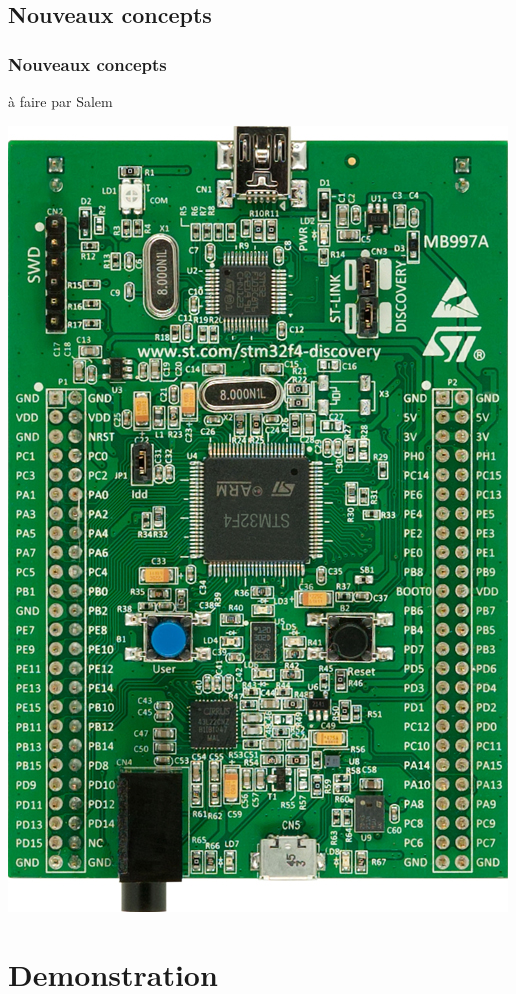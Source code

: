 \documentclass{beamer}
\begin{document}
\subsection{Nouveaux concepts}
\begin{frame}
\frametitle{Nouveaux concepts}
à faire par Salem
\begin{center}
 \includegraphics[scale=0.1]{../images/stm32f4_discovery.jpg}
\end{center}
\end{frame}

\section{Demonstration}
\end{document}
